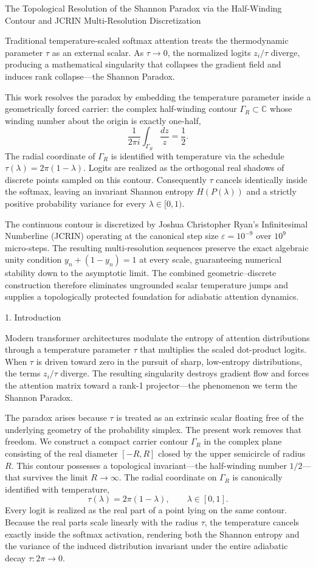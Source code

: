 The Topological Resolution of the Shannon Paradox via the Half-Winding Contour and JCRIN Multi-Resolution Discretization

Traditional temperature-scaled softmax attention treats the thermodynamic parameter \(\tau\) as an external scalar. As \(\tau\to 0\), the normalized logits \(z_i/\tau\) diverge, producing a mathematical singularity that collapses the gradient field and induces rank collapse—the Shannon Paradox.  

This work resolves the paradox by embedding the temperature parameter inside a geometrically forced carrier: the complex half-winding contour \(\Gamma_R\subset\mathbb{C}\) whose winding number about the origin is exactly one-half,
\[
\frac{1}{2\pi i}\int_{\Gamma_R}\frac{dz}{z}=\frac12.
\]
The radial coordinate of \(\Gamma_R\) is identified with temperature via the schedule \(\tau(\lambda)=2\pi(1-\lambda)\). Logits are realized as the orthogonal real shadows of discrete points sampled on this contour. Consequently \(\tau\) cancels identically inside the softmax, leaving an invariant Shannon entropy \(H(P(\lambda))\) and a strictly positive probability variance for every \(\lambda\in[0,1)\).  

The continuous contour is discretized by Joshua Christopher Ryan’s Infinitesimal Numberline (JCRIN) operating at the canonical step size \(\varepsilon=10^{-9}\) over \(10^9\) micro-steps. The resulting multi-resolution sequences preserve the exact algebraic unity condition \(y_n+(1-y_n)=1\) at every scale, guaranteeing numerical stability down to the asymptotic limit. The combined geometric–discrete construction therefore eliminates ungrounded scalar temperature jumps and supplies a topologically protected foundation for adiabatic attention dynamics.

1. Introduction

Modern transformer architectures modulate the entropy of attention distributions through a temperature parameter \(\tau\) that multiplies the scaled dot-product logits. When \(\tau\) is driven toward zero in the pursuit of sharp, low-entropy distributions, the terms \(z_i/\tau\) diverge. The resulting singularity destroys gradient flow and forces the attention matrix toward a rank-1 projector—the phenomenon we term the Shannon Paradox.

The paradox arises because \(\tau\) is treated as an extrinsic scalar floating free of the underlying geometry of the probability simplex. The present work removes that freedom. We construct a compact carrier contour \(\Gamma_R\) in the complex plane consisting of the real diameter \([-R,R]\) closed by the upper semicircle of radius \(R\). This contour possesses a topological invariant—the half-winding number \(1/2\)—that survives the limit \(R\to\infty\). The radial coordinate on \(\Gamma_R\) is canonically identified with temperature,
\[
\tau(\lambda)=2\pi(1-\lambda),\qquad\lambda\in[0,1].
\]
Every logit is realized as the real part of a point lying on the same contour. Because the real parts scale linearly with the radius \(\tau\), the temperature cancels exactly inside the softmax activation, rendering both the Shannon entropy and the variance of the induced distribution invariant under the entire adiabatic decay \(\tau:2\pi\to 0\).

